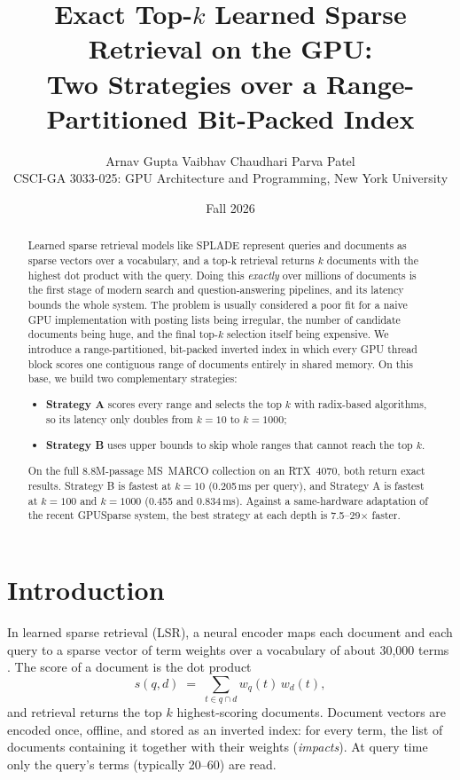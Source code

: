 \documentclass[11pt]{article}
\title{Exact Top-$k$ Learned Sparse Retrieval on the GPU:\\
Two Strategies over a Range-Partitioned Bit-Packed Index}
\author{Arnav Gupta \quad Vaibhav Chaudhari \quad Parva Patel\\[4pt]
\small CSCI-GA 3033-025: GPU Architecture and Programming, New York University}
\date{Fall 2026}
\begin{document}
\maketitle

\begin{abstract}
Learned sparse retrieval models like SPLADE represent queries and documents as sparse vectors over a vocabulary, and a top-k retrieval returns $k$ documents with the highest dot product with the query. Doing this \emph{exactly} over millions of documents is the first stage of modern search and question-answering pipelines, and its latency bounds the whole system. The problem is usually considered a poor fit for a naive GPU implementation with posting lists being irregular, the number of candidate documents being huge, and the final top-$k$ selection itself being expensive. We introduce a range-partitioned, bit-packed inverted index in which every GPU thread block scores one contiguous range of documents entirely in shared memory. On this base, we build two complementary strategies:
\begin{itemize}
\item \textbf{Strategy A} scores every range and selects the top $k$ with radix-based algorithms, so
  its latency only doubles from $k=10$ to $k=1000$;
\item \textbf{Strategy B} uses upper bounds to skip whole ranges that cannot reach the top $k$.
\end{itemize}
On the full 8.8M-passage MS~MARCO collection on an RTX~4070, both return exact results. Strategy B is fastest at $k=10$ (0.205\,ms per query), and Strategy A is fastest at $k=100$ and
$k=1000$ (0.455 and 0.834\,ms). Against a same-hardware adaptation of the recent GPUSparse system,
the best strategy at each depth is 7.5--29$\times$ faster.
\end{abstract}

\section{Introduction}

In learned sparse retrieval (LSR), a neural encoder maps each document and each query to a sparse vector of term weights over a vocabulary of about 30{,}000 terms \cite{splade,spladepp}. The score of a document is the dot product
\[
  s(q,d) \;=\; \sum_{t \in q \cap d} w_q(t)\, w_d(t),
\]
and retrieval returns the top $k$ highest-scoring documents. Document vectors are encoded once, offline, and stored as an inverted index: for every term, the list of documents containing it together with their weights (\emph{impacts}). At query time only the query's terms (typically 20--60) are read.
\end{document}
